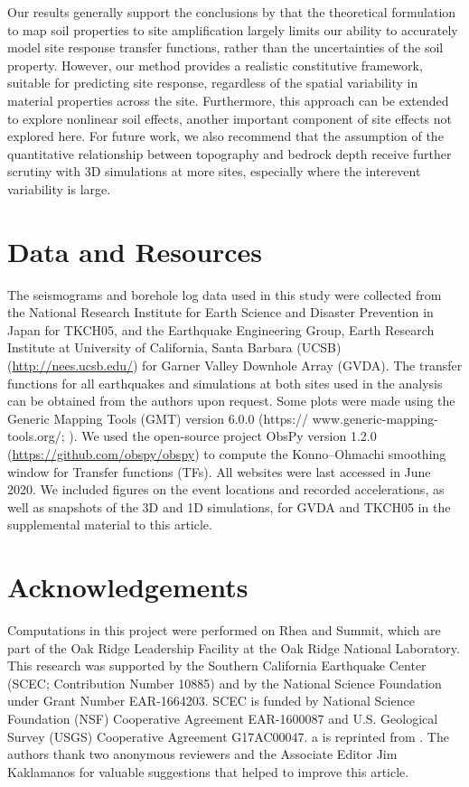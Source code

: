 {Our results generally support the conclusions by \citet{thompsonImpedimentsPredictingSite2009} that the theoretical formulation to map soil properties to site amplification largely limits our ability to accurately model site response transfer functions, rather than the uncertainties of the soil property. However, our method provides a realistic constitutive framework, suitable for predicting site response, regardless of the spatial variability in material properties across the site. Furthermore, this approach can be extended to explore nonlinear soil effects, another important component of site effects not explored here. For future work, we also recommend that the assumption of the quantitative relationship between topography and bedrock depth receive further scrutiny with 3D simulations at more sites, especially where the interevent variability is large.

\section*{Data and Resources}
The seismograms and borehole log data used in this study were collected from the National Research Institute for Earth Science and Disaster Prevention \citep{nationalresearchinstituteforearthscienceanddisasterresilienceNIEDKNETKiKnet2019} in Japan for TKCH05, and the Earthquake Engineering Group, Earth Research Institute at University of California, Santa Barbara (UCSB) (\url{http://nees.ucsb.edu/}) for Garner Valley Downhole Array (GVDA). The transfer functions for all earthquakes and simulations at both sites used in the analysis can be obtained from the authors upon request. Some plots were made using the Generic Mapping Tools (GMT) version 6.0.0 (https:// www.generic-mapping-tools.org/; \citealt{wesselGenericMappingTools2019}). We used the open-source project ObsPy version 1.2.0 (\url{https://github.com/obspy/obspy}) to compute the Konno–Ohmachi smoothing window for Transfer functions (TFs). All websites were last accessed in June 2020. We included figures on the event locations and recorded accelerations, as well as snapshots of the 3D and 1D simulations, for GVDA and TKCH05 in the supplemental material to this article.

\section*{Acknowledgements}

Computations in this project were performed on Rhea and Summit, which are part of the Oak Ridge Leadership Facility at the Oak Ridge National Laboratory. This research was supported by the Southern California Earthquake Center (SCEC; Contribution Number 10885) and by the National Science Foundation under Grant Number EAR-1664203. SCEC is funded by National Science Foundation (NSF) Cooperative Agreement EAR-1600087 and U.S. Geological Survey (USGS) Cooperative Agreement G17AC00047. a is reprinted from \citet{thompsonTaxonomySiteResponse2012}. The authors thank two anonymous reviewers and the Associate Editor Jim Kaklamanos for valuable suggestions that helped to improve this article.

}
